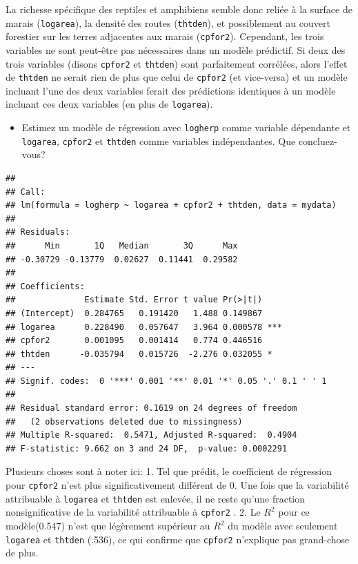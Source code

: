\documentclass[12pt,]{book}
\providecommand{\tightlist}{%
  \setlength{\itemsep}{0pt}\setlength{\parskip}{0pt}}
\begin{document}
La richesse spécifique des reptiles et amphibiens semble donc reliée à la surface de marais (\texttt{logarea}), la densité des routes (\texttt{thtden}), et possiblement au couvert forestier sur les terres adjacentes aux marais (\texttt{cpfor2}). Cependant, les trois variables ne sont peut-être pas nécessaires dans un modèle prédictif. Si deux des trois variables (disons \texttt{cpfor2} et \texttt{thtden}) sont parfaitement corrélées, alors l'effet de \texttt{thtden} ne serait rien de plus que celui de \texttt{cpfor2} (et vice-versa) et un modèle incluant l'une des deux variables ferait des prédictions identiques à un modèle incluant ces deux variables (en plus de \texttt{logarea}).

\begin{itemize}
\tightlist
\item
  Estimez un modèle de régression avec \texttt{logherp} comme variable dépendante et \texttt{logarea}, \texttt{cpfor2} et \texttt{thtden} comme variables indépendantes. Que concluez-vous?
\end{itemize}

\begin{verbatim}
## 
## Call:
## lm(formula = logherp ~ logarea + cpfor2 + thtden, data = mydata)
## 
## Residuals:
##      Min       1Q   Median       3Q      Max 
## -0.30729 -0.13779  0.02627  0.11441  0.29582 
## 
## Coefficients:
##              Estimate Std. Error t value Pr(>|t|)    
## (Intercept)  0.284765   0.191420   1.488 0.149867    
## logarea      0.228490   0.057647   3.964 0.000578 ***
## cpfor2       0.001095   0.001414   0.774 0.446516    
## thtden      -0.035794   0.015726  -2.276 0.032055 *  
## ---
## Signif. codes:  0 '***' 0.001 '**' 0.01 '*' 0.05 '.' 0.1 ' ' 1
## 
## Residual standard error: 0.1619 on 24 degrees of freedom
##   (2 observations deleted due to missingness)
## Multiple R-squared:  0.5471, Adjusted R-squared:  0.4904 
## F-statistic: 9.662 on 3 and 24 DF,  p-value: 0.0002291
\end{verbatim}

Plusieurs choses sont à noter ici:
1. Tel que prédit, le coefficient de régression pour \texttt{cpfor2} n'est plus significativement différent de 0. Une fois que la variabilité attribuable à \texttt{logarea} et \texttt{thtden} est enlevée, il ne reste qu'une fraction nonsignificative de la variabilité attribuable à \texttt{cpfor2} .
2. Le \(R^2\) pour ce modèle(0.547) n'est que légèrement supérieur au \(R^2\) du modèle avec seulement \texttt{logarea} et \texttt{thtden} (.536), ce qui confirme que \texttt{cpfor2} n'explique pas grand-chose de plus.
\end{document}
